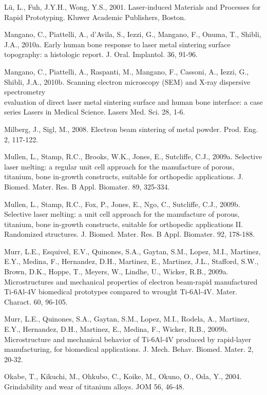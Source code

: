 \documentclass[10pt]{article}
\begin{document}
Lü, L., Fuh, J.Y.H., Wong, Y.S., 2001. Laser-induced Materials and Processes for Rapid Prototyping. Kluwer Academic Publishers, Boston.

Mangano, C., Piattelli, A., d'Avila, S., Iezzi, G., Mangano, F., Onuma, T., Shibli, J.A., 2010a. Early human bone response to laser metal sintering surface topography: a histologic report. J. Oral. Implantol. 36, 91-96.

Mangano, C., Piattelli, A., Raspanti, M., Mangano, F., Cassoni, A., Iezzi, G., Shibli, J.A., 2010b. Scanning electron microscopy (SEM) and X-ray dispersive spectrometry\\
evaluation of direct laser metal sintering surface and human bone interface: a case series Lasers in Medical Science. Lasers Med. Sci. 28, 1-6.

Milberg, J., Sigl, M., 2008. Electron beam sintering of metal powder. Prod. Eng. 2, 117-122.

Mullen, L., Stamp, R.C., Brooks, W.K., Jones, E., Sutcliffe, C.J., 2009a. Selective laser melting: a regular unit cell approach for the manufacture of porous, titanium, bone in-growth constructs, suitable for orthopedic applications. J. Biomed. Mater. Res. B Appl. Biomater. 89, 325-334.

Mullen, L., Stamp, R.C., Fox, P., Jones, E., Ngo, C., Sutcliffe, C.J., 2009b. Selective laser melting: a unit cell approach for the manufacture of porous, titanium, bone in-growth constructs, suitable for orthopedic applications II. Randomized structures. J. Biomed. Mater. Res. B Appl. Biomater. 92, 178-188.

Murr, L.E., Esquivel, E.V., Quinones, S.A., Gaytan, S.M., Lopez, M.I., Martinez, E.Y., Medina, F., Hernandez, D.H., Martinez, E., Martinez, J.L., Stafford, S.W., Brown, D.K., Hoppe, T., Meyers, W., Lindhe, U., Wicker, R.B., 2009a. Microstructures and mechanical properties of electron beam-rapid manufactured Ti-6Al-4V biomedical prototypes compared to wrought Ti-6Al-4V. Mater. Charact. 60, 96-105.

Murr, L.E., Quinones, S.A., Gaytan, S.M., Lopez, M.I., Rodela, A., Martinez, E.Y., Hernandez, D.H., Martinez, E., Medina, F., Wicker, R.B., 2009b. Microstructure and mechanical behavior of Ti-6Al-4V produced by rapid-layer manufacturing, for biomedical applications. J. Mech. Behav. Biomed. Mater. 2, 20-32.

Okabe, T., Kikuchi, M., Ohkubo, C., Koike, M., Okuno, O., Oda, Y., 2004. Grindability and wear of titanium alloys. JOM 56, 46-48.
\end{document}
